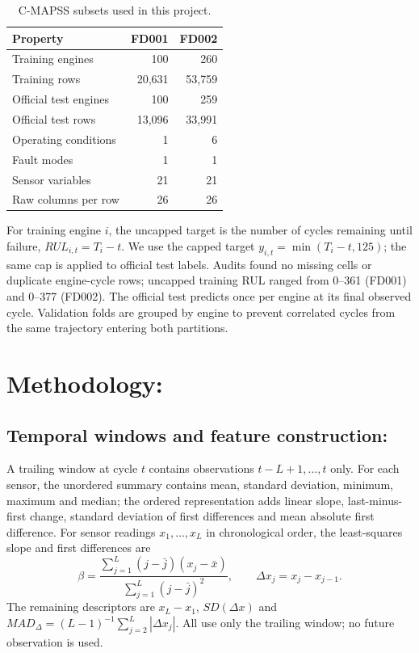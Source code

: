 \documentclass[10pt,a4paper]{article}
\begin{document}
\begin{table}[H]\centering
\caption{C-MAPSS subsets used in this project.}\begin{tabular}{lrr}\toprule
Property & FD001 & FD002\\\midrule
Training engines & 100 & 260\\
Training rows & 20,631 & 53,759\\
Official test engines & 100 & 259\\
Official test rows & 13,096 & 33,991\\
Operating conditions & 1 & 6\\
Fault modes & 1 & 1\\
Sensor variables & 21 & 21\\
Raw columns per row & 26 & 26\\\bottomrule\end{tabular}\end{table}

For training engine $i$, the uncapped target is the number of cycles remaining until failure, $RUL_{i,t}=T_i-t$. We use the capped target $y_{i,t}=\min(T_i-t,125)$; the same cap is applied to official test labels. Audits found no missing cells or duplicate engine-cycle rows; uncapped training RUL ranged from 0--361 (FD001) and 0--377 (FD002). The official test predicts once per engine at its final observed cycle. Validation folds are grouped by engine to prevent correlated cycles from the same trajectory entering both partitions.

\section{Methodology:}
\subsection{Temporal windows and feature construction:}
A trailing window at cycle $t$ contains observations $t-L+1,\ldots,t$ only. For each sensor, the unordered summary contains mean, standard deviation, minimum, maximum and median; the ordered representation adds linear slope, last-minus-first change, standard deviation of first differences and mean absolute first difference.
For sensor readings $x_1,\ldots,x_L$ in chronological order, the least-squares slope and first differences are
\[
\beta=\frac{\sum_{j=1}^{L}(j-\bar j)(x_j-\bar x)}{\sum_{j=1}^{L}(j-\bar j)^2},\qquad \Delta x_j=x_j-x_{j-1}.
\]
The remaining descriptors are $x_L-x_1$, $SD(\Delta x)$ and $MAD_{\Delta}=(L-1)^{-1}\sum_{j=2}^{L}|\Delta x_j|$. All use only the trailing window; no future observation is used.
\end{document}
